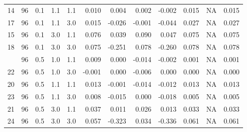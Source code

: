 \begin{longtable}[t]{cccccrrrrrrc}
14 & 96 & 0.1 & 1.1 & 1.1 & 0.010 & 0.004 & 0.002 & -0.002 & 0.015 & NA & 0.015\\
17 & 96 & 0.1 & 1.1 & 3.0 & 0.015 & -0.026 & -0.001 & -0.044 & 0.027 & NA & 0.027\\
15 & 96 & 0.1 & 3.0 & 1.1 & 0.076 & 0.039 & 0.090 & 0.047 & 0.075 & NA & 0.075\\
18 & 96 & 0.1 & 3.0 & 3.0 & 0.075 & -0.251 & 0.078 & -0.260 & 0.078 & NA & 0.078\\
\addlinespace
19 & 96 & 0.5 & 1.0 & 1.1 & 0.009 & 0.000 & -0.014 & -0.002 & 0.001 & NA & 0.001\\
22 & 96 & 0.5 & 1.0 & 3.0 & -0.001 & 0.000 & -0.006 & 0.000 & 0.000 & NA & 0.000\\
20 & 96 & 0.5 & 1.1 & 1.1 & 0.013 & -0.001 & -0.014 & -0.012 & 0.013 & NA & 0.013\\
23 & 96 & 0.5 & 1.1 & 3.0 & 0.008 & -0.015 & 0.000 & -0.018 & 0.005 & NA & 0.005\\
21 & 96 & 0.5 & 3.0 & 1.1 & 0.037 & 0.011 & 0.026 & 0.013 & 0.033 & NA & 0.033\\
24 & 96 & 0.5 & 3.0 & 3.0 & 0.057 & -0.323 & 0.034 & -0.336 & 0.061 & NA & 0.061\\
\bottomrule
\end{longtable}

\endgroup{}
